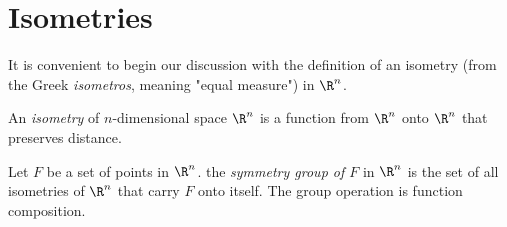 \section{Isometries}

\begin{remark}
	It is convenient to begin our discussion with the definition of an isometry (from the Greek \textit{isometros}, meaning "equal measure") in $\R^n$.
\end{remark}

\begin{definition}[Isometry]
	An \textit{isometry} of $n$-dimensional space $\R^n$ is a function from $\R^n$ onto $\R^n$ that preserves distance.
\end{definition}

\begin{definition}
	Let $F$ be a set of points in $\R^n$. the \textit{symmetry group of $F$} in $\R^n$ is the set of all isometries of $\R^n$ that carry $F$ onto itself. The group operation is function composition.
\end{definition}
